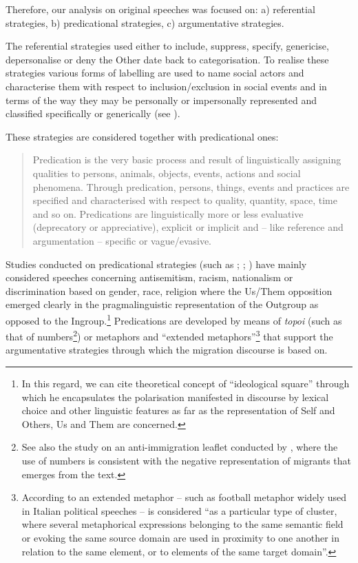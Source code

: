 \documentclass[output=paper]{langscibook}
\begin{document}
Therefore, our analysis on original speeches was focused on: a) referential strategies, b) predicational strategies, c) argumentative strategies.

The referential strategies used either to include, suppress, specify, genericise, depersonalise or deny the Other date back to  categorisation. To realise these strategies various forms of labelling are used to name social actors and characterise them with respect to inclusion/exclusion in social events and in terms of the way they may be personally or impersonally represented and classified specifically or generically (see \citealt[145--146]{Fairclough2003}).

These strategies are considered together with predicational ones: 

\begin{quote}
Predication is the very basic process and result of linguistically assigning qualities to persons, animals, objects, events, actions and social phenomena. Through predication, persons, things, events and practices are specified and characterised with respect to quality, quantity, space, time and so on. Predications are linguistically more or less evaluative (deprecatory or appreciative), explicit or implicit and – like reference and argumentation – specific or vague/evasive. \citep[54]{ReisiglWodak2001} 
\end{quote}

Studies conducted on predicational strategies (such as \citealp{Wodak2000, Wodak2001}; \citealp{VanDijk2002}; \citealp{ReisiglWodak2001}) have mainly considered speeches concerning antisemitism, racism, nationalism or discrimination based on gender, race, religion where the Us/Them opposition emerged clearly in the pragmalinguistic representation of the Outgroup as opposed to the Ingroup.\footnote{In this regard, we can cite  theoretical concept of “ideological square” through which he encapsulates the polarisation manifested in discourse by lexical choice and other linguistic features as far as the representation of Self and Others, Us and Them are concerned.} Predications are developed by means of \textit{topoi} (such as that of numbers\footnote{See also the study on an anti-immigration leaflet conducted by \citet[118--124]{Semino2008}, where the use of numbers is consistent with the negative representation of migrants that emerges from the text.}) or metaphors and “extended metaphors”\footnote{According to \citet[25]{Semino2008} an extended metaphor -- such as football metaphor widely used in Italian political speeches -- is considered “as a particular type of cluster, where several metaphorical expressions belonging to the same semantic field or evoking the same source domain are used in proximity to one another in relation to the same element, or to elements of the same target domain”.}  that support the argumentative strategies through which the migration discourse is based on. 
\end{document}

